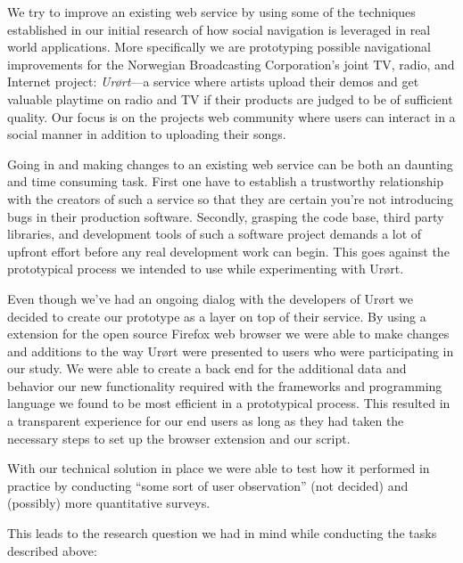 We try to improve an existing web service by using some of the techniques
established in our initial research of how social navigation is leveraged
in real world applications. More specifically we are prototyping possible
navigational improvements for the Norwegian Broadcasting Corporation's joint
TV, radio, and Internet project: \emph{Ur\o{}rt}---a service where artists upload
their demos and get valuable playtime on radio and TV if their products are
judged to be of sufficient quality. Our focus is on the projects
web community where users can
interact in a social manner in addition to uploading their songs.

Going in and making changes to an existing web service can be both an
daunting and time consuming task. First one have to establish a trustworthy
relationship with the creators of such a service so that they are certain
you're not introducing bugs in their production software. Secondly, grasping the
code base, third party libraries, and development tools of such a software
project demands a lot of upfront effort before any real development work can
begin. This goes against the prototypical process we intended to use while
experimenting with Ur\o{}rt.

Even though we've had an ongoing dialog with the developers of Ur\o{}rt we
decided to create our prototype as a layer on top of their service. By using a
extension for the open source Firefox%
web browser we were able to make changes and additions to the way Ur\o{}rt were
presented to users who were participating in our study. We were able to create
a back end for the additional data and behavior our new functionality required
with the frameworks and programming language we found to be most efficient in
a prototypical process. This resulted in a transparent experience for our end
users as long as they had taken the necessary steps to set up the browser
extension and our script.

With our technical solution in place we were able to test how it performed in
practice by conducting ``some sort of user observation'' (not decided) and
(possibly) more quantitative surveys.

This leads to the research question we had in mind while conducting
the tasks described above:

